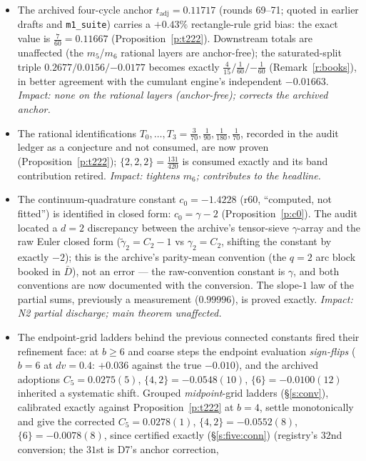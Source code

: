 \documentclass[11pt]{article}
\numberwithin{equation}{section}
\theoremstyle{definition}
\theoremstyle{remark}
\begin{document}
\begin{itemize}
{intermediate rung; headline unaffected.}
\item[D7.] The archived four-cycle anchor
$t_{\mathrm{adj}}=0.11717$ (rounds 69--71; quoted in earlier
drafts and \texttt{m1\_suite}) carries a $+0.43\%$
rectangle-rule grid bias: the exact value is $\tfrac7{60}
=0.11667$ (Proposition~\ref{p:t222}). Downstream totals are
unaffected (the $m_5$/$m_6$ rational layers are anchor-free);
the saturated-split triple $0.2677/0.0156/{-0.0177}$ becomes
exactly $\tfrac4{15}/\tfrac1{60}/{-\tfrac1{60}}$
(Remark~\ref{r:books}), in better agreement with the cumulant
engine's independent $-0.01663$. \emph{Impact: none on the
rational layers (anchor-free); corrects the archived anchor.}
\item[D8.] The rational identifications
$T_0,\dots,T_3=\tfrac3{70},\tfrac1{90},\tfrac1{180},\tfrac1{70}$,
recorded in the audit ledger as a conjecture and not consumed, are
now proven (Proposition~\ref{p:t222}); $\{2,2,2\}=\tfrac{131}{420}$
is consumed exactly and its band contribution retired.
\emph{Impact: tightens $m_6$; contributes to the headline.}
\item[D9.] The continuum-quadrature constant
$c_0=-1.4228$ (r60, ``computed, not fitted'') is identified in
closed form: $c_0=\gamma-2$ (Proposition~\ref{p:c0}). The audit
located a $d=2$ discrepancy between the archive's tensor-sieve
$\gamma$-array and the raw Euler closed form
($\widetilde\gamma_2=C_2-1$ vs $\gamma_2=C_2$, shifting the
constant by exactly $-2$); this is the archive's parity-mean
convention (the $q=2$ arc block booked in $\bar D$), not an
error --- the raw-convention constant is $\gamma$, and both
conventions are now documented with the conversion. The slope-$1$
law of the partial sums, previously a measurement
($0.99996$), is proved exactly. \emph{Impact: N2 partial
discharge; main theorem unaffected.}
\item[D10.] The endpoint-grid ladders behind
the previous connected constants fired their refinement face:
at $b\ge6$ and coarse steps the endpoint evaluation
\emph{sign-flips} ($b=6$ at $dv=0.4$: $+0.036$ against the true
$-0.010$), and the archived adoptions $C_5=0.0275(5)$,
$\{4,2\}=-0.0548(10)$, $\{6\}=-0.0100(12)$ inherited a
systematic shift. Grouped \emph{midpoint}-grid ladders
(\S\ref{s:conv}), calibrated exactly against
Proposition~\ref{p:t222} at $b=4$, settle monotonically and give
the corrected $C_5=0.0278(1)$, $\{4,2\}=-0.0552(8)$,
$\{6\}=-0.0078(8)$, since certified exactly
(\S\ref{s:five:conn}) (registry's
$32$nd conversion; the $31$st is D7's anchor correction,

\end{itemize}
\end{document}
